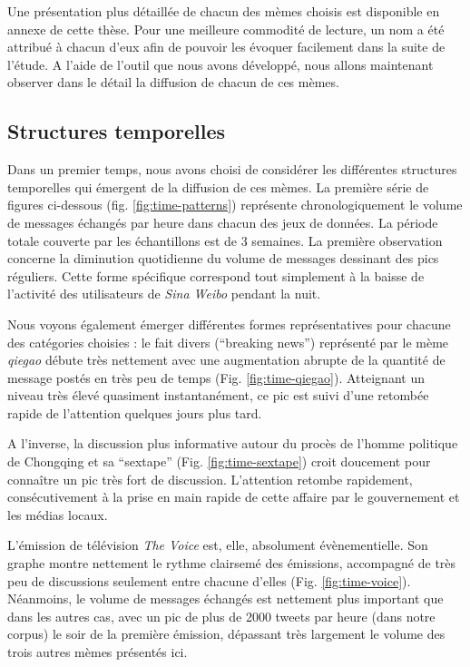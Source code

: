 Une présentation plus détaillée de chacun des mèmes choisis est disponible en annexe de cette thèse. Pour une meilleure commodité de lecture, un nom a été attribué \`a chacun d'eux afin de pouvoir les évoquer facilement dans la suite de l'étude. A l'aide de l'outil que nous avons développé, nous allons maintenant observer dans le détail la diffusion de chacun de ces mèmes. 

\newpage

\subsection[Structures temporelles]{Structures temporelles}

Dans un premier temps, nous avons choisi de considérer les différentes structures temporelles qui émergent de la diffusion de ces mèmes. La première série de figures ci-dessous (fig. \ref{fig:time-patterns}) représente chronologiquement le volume de messages échangés par heure dans chacun des jeux de données. La période totale couverte par les échantillons est de 3 semaines. La première observation concerne la diminution quotidienne du volume de messages dessinant des pics réguliers. Cette forme spécifique correspond tout simplement \`a la baisse de l{\textquoteright}activité des utilisateurs de \textit{Sina Weibo} pendant la nuit.

Nous voyons également émerger différentes formes représentatives pour chacune des catégories choisies : le fait divers ({\textquotedblleft}breaking news{\textquotedblright}) représenté par le mème \textit{qiegao} débute très nettement avec une augmentation abrupte de la quantité de message postés en très peu de temps (Fig. \ref{fig:time-qiegao}). Atteignant un niveau très élevé quasiment instantanément, ce pic est suivi d{\textquoteright}une retombée rapide de l{\textquoteright}attention quelques jours plus tard.  

A l'inverse, la discussion plus informative autour du procès de l{\textquoteright}homme politique de Chongqing et sa {\textquotedblleft}sextape{\textquotedblright} (Fig. \ref{fig:time-sextape}) croit doucement pour conna\^itre un pic très fort de discussion. L'attention retombe rapidement, consécutivement à la prise en main rapide de cette affaire par le gouvernement et les médias locaux.

L{\textquoteright}émission de télévision \textit{The Voice} est, elle, absolument évènementielle. Son graphe montre nettement le rythme clairsemé des émissions, accompagné de très peu de discussions seulement entre chacune d'elles (Fig. \ref{fig:time-voice}). Néanmoins, le volume de messages échangés est nettement plus important que dans les autres cas, avec un pic de plus de 2000 tweets par heure (dans notre corpus) le soir de la première émission, dépassant très largement le volume des trois autres mèmes présentés ici.

